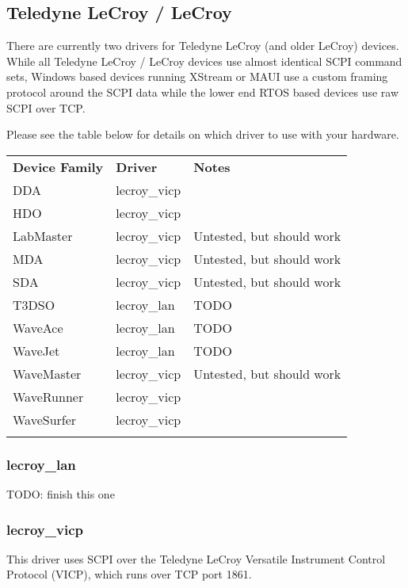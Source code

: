 \subsection{Teledyne LeCroy / LeCroy}

There are currently two drivers for Teledyne LeCroy (and older LeCroy) devices. While all Teledyne LeCroy / LeCroy
devices use almost identical SCPI command sets, Windows based devices running XStream or MAUI use a custom framing
protocol around the SCPI data while the lower end RTOS based devices use raw SCPI over TCP.

Please see the table below for details on which driver to use with  your hardware.

\begin{tabularx}{16cm}{llX}
\thickhline
\textbf{Device Family} & \textbf{Driver} & \textbf{Notes} \\
\thickhline
DDA & lecroy\_vicp & \\
\thickhline
HDO & lecroy\_vicp & \\
\thickhline
LabMaster & lecroy\_vicp & Untested, but should work\\
\thickhline
MDA & lecroy\_vicp &  Untested, but should work\\
\thickhline
SDA & lecroy\_vicp &  Untested, but should work\\
\thickhline
T3DSO & lecroy\_lan & TODO \\
\thickhline
WaveAce & lecroy\_lan & TODO \\
\thickhline
WaveJet & lecroy\_lan & TODO \\
\thickhline
WaveMaster & lecroy\_vicp & Untested, but should work \\
\thickhline
WaveRunner & lecroy\_vicp &  \\
\thickhline
WaveSurfer & lecroy\_vicp &  \\
\thickhline
\end{tabularx}

\subsubsection{lecroy\_lan}

TODO: finish this one

\subsubsection{lecroy\_vicp}

This driver uses SCPI over the Teledyne LeCroy Versatile Instrument Control Protocol (VICP), which runs over TCP port
1861.


